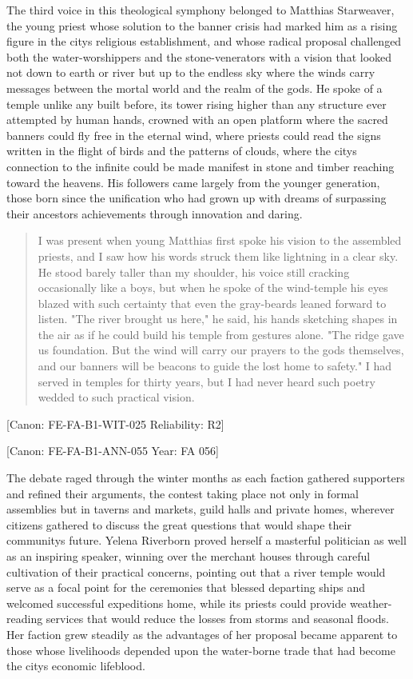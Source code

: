 The third voice in this theological symphony belonged to Matthias
Starweaver, the young priest whose solution to the banner crisis had
marked him as a rising figure in the city\textquotesingle s religious
establishment, and whose radical proposal challenged both the
water-worshippers and the stone-venerators with a vision that looked not
down to earth or river but up to the endless sky where the winds carry
messages between the mortal world and the realm of the gods. He spoke of
a temple unlike any built before, its tower rising higher than any
structure ever attempted by human hands, crowned with an open platform
where the sacred banners could fly free in the eternal wind, where
priests could read the signs written in the flight of birds and the
patterns of clouds, where the city\textquotesingle s connection to the
infinite could be made manifest in stone and timber reaching toward the
heavens. His followers came largely from the younger generation, those
born since the unification who had grown up with dreams of surpassing
their ancestors\textquotesingle{} achievements through innovation and
daring.

\begin{quote}
I was present when young Matthias first spoke his vision to the
assembled priests, and I saw how his words struck them like lightning in
a clear sky. He stood barely taller than my shoulder, his voice still
cracking occasionally like a boy\textquotesingle s, but when he spoke of
the wind-temple his eyes blazed with such certainty that even the
gray-beards leaned forward to listen. "The river brought us here," he
said, his hands sketching shapes in the air as if he could build his
temple from gestures alone. "The ridge gave us foundation. But the wind
will carry our prayers to the gods themselves, and our banners will be
beacons to guide the lost home to safety." I had served in temples for
thirty years, but I had never heard such poetry wedded to such practical
vision.
\end{quote}

{[}Canon: FE-FA-B1-WIT-025 \textbar{} Reliability: R2{]}

{[}Canon: FE-FA-B1-ANN-055 \textbar{} Year: FA 056{]}

The debate raged through the winter months as each faction gathered
supporters and refined their arguments, the contest taking place not
only in formal assemblies but in taverns and markets, guild halls and
private homes, wherever citizens gathered to discuss the great questions
that would shape their community\textquotesingle s future. Yelena
Riverborn proved herself a masterful politician as well as an inspiring
speaker, winning over the merchant houses through careful cultivation of
their practical concerns, pointing out that a river temple would serve
as a focal point for the ceremonies that blessed departing ships and
welcomed successful expeditions home, while its priests could provide
weather-reading services that would reduce the losses from storms and
seasonal floods. Her faction grew steadily as the advantages of her
proposal became apparent to those whose livelihoods depended upon the
water-borne trade that had become the city\textquotesingle s economic
lifeblood.

